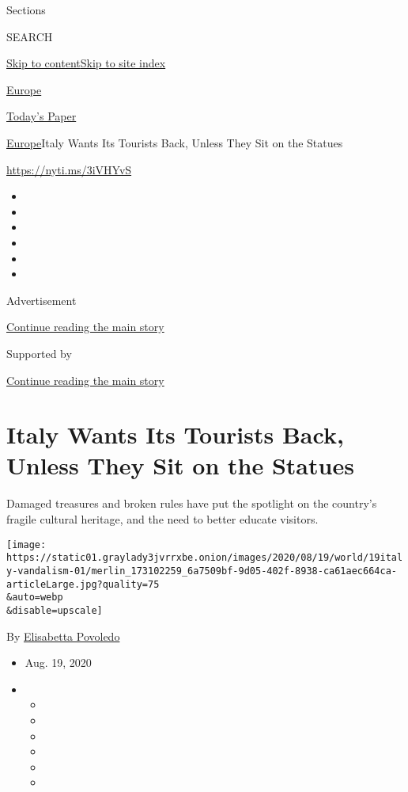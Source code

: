 Sections

SEARCH

\protect\hyperlink{site-content}{Skip to
content}\protect\hyperlink{site-index}{Skip to site index}

\href{https://www.nytimes3xbfgragh.onion/section/world/europe}{Europe}

\href{https://myaccount.nytimes3xbfgragh.onion/auth/login?response_type=cookie\&client_id=vi}{}

\href{https://www.nytimes3xbfgragh.onion/section/todayspaper}{Today's
Paper}

\href{/section/world/europe}{Europe}\textbar{}Italy Wants Its Tourists
Back, Unless They Sit on the Statues

\url{https://nyti.ms/3iVHYvS}

\begin{itemize}
\item
\item
\item
\item
\item
\item
\end{itemize}

Advertisement

\protect\hyperlink{after-top}{Continue reading the main story}

Supported by

\protect\hyperlink{after-sponsor}{Continue reading the main story}

\hypertarget{italy-wants-its-tourists-back-unless-they-sit-on-the-statues}{%
\section{Italy Wants Its Tourists Back, Unless They Sit on the
Statues}\label{italy-wants-its-tourists-back-unless-they-sit-on-the-statues}}

Damaged treasures and broken rules have put the spotlight on the
country's fragile cultural heritage, and the need to better educate
visitors.

\texttt{[image: https://static01.graylady3jvrrxbe.onion/images/2020/08/19/world/19italy-vandalism-01/merlin\_173102259\_6a7509bf-9d05-402f-8938-ca61aec664ca-articleLarge.jpg?quality=75\\\&auto=webp\\\&disable=upscale]}

By
\href{https://www.nytimes3xbfgragh.onion/by/elisabetta-povoledo}{Elisabetta
Povoledo}

\begin{itemize}
\item
  Aug. 19, 2020
\item
  \begin{itemize}
  \item
  \item
  \item
  \item
  \item
  \item
  \end{itemize}
\end{itemize}

